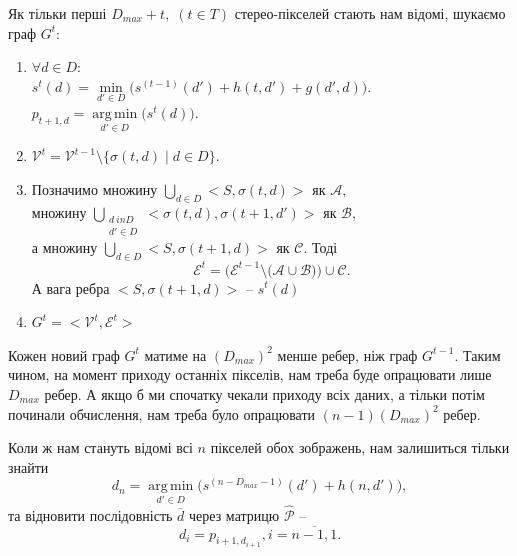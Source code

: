 \documentclass{ConfFTI}
\DeclareMathOperator*{\argmin}{arg\,min}
\begin{document}
Як тільки перші $D_{max} + t, \; ( t \in T)$ стерео-пікселей стають нам відомі, шукаємо граф $G^t$:
\begin{enumerate}
	\item 
		$\forall d \in D :$\\
		$s^t(d) = \min\limits_{d' \in D} \big( s^{(t-1)}(d') + h(t, d') + g(d', d) \big).$\\
		$p_{t+1,d} = \argmin\limits_{d' \in D}{\big( s^t(d) \big) }$.
	\item 
		$\mathcal{V}^t = \mathcal{V}^{t-1} \setminus \{ \sigma(t, d) \; | \; d \in D \}.$
	\item %
		Позначимо множину $ \bigcup\limits_{d \in D} <S, \sigma(t, d) > $ як $ \mathcal{A},$ \\
		множину $ \bigcup\limits_{\substack{d \ in D \\ d' \in D}} <\sigma(t, d), \sigma(t+1, d') > $ як $ \mathcal{B},$ \\
		а множину $ \bigcup\limits_{d \in D} <S, \sigma(t+1, d) > $ як $ \mathcal{C}. $ Тоді 
		$$\mathcal{E}^t = \Big( \mathcal{E}^{t-1} \setminus \big( \mathcal{A} \cup \mathcal{B} \big) \Big) \cup \mathcal{C}.$$
		А вага ребра $ <S, \sigma(t+1, d) >$ -- $ s^t(d)$ %
	\item 
		$G^t = <\mathcal{V}^t, \mathcal{E}^t> $ \\
\end{enumerate}



Кожен новий граф $G^t$ матиме на $(D_{max})^2$ менше ребер, ніж граф $G^{t-1}$. Таким чином, на момент приходу останніх пікселів, нам треба буде опрацювати лише $D_{max}$ ребер. А якщо б ми спочатку чекали приходу всіх даних, а тільки потім починали обчислення, нам треба було опрацювати 
$(n-1)(D_{max})^2$ ребер.

Коли ж нам стануть відомі всі $n$ пікселей обох зображень, нам залишиться тільки знайти
$$ d_n = \argmin\limits_{d' \in D} \big( s^{(n-D_{max}-1)}(d') + h(n, d') \big),$$
та відновити послідовність $\overline{d}$ через матрицю $\hat{\mathcal{P}}$ --
$$ d_i = p_{i+1,d_{i+1}}, i = \overline{n-1, 1}. $$

\end{document}
